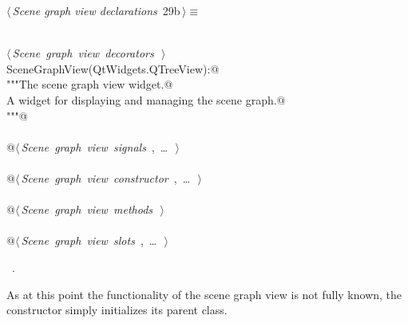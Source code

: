 \documentclass[
    a4paper,      %
    10pt,         %
    openright,    %
    notitlepage,  %
    parskip=half, %
]{scrreprt}       %
\theoremstyle{definition}                    %
\begin{document}
\begin{flushleft} \small
\begin{minipage}{\linewidth}\label{scrap27}\raggedright\small
{} $\langle\,${\itshape Scene graph view declarations}\nobreak\ {\footnotesize {29b}}$\,\rangle\equiv$
\vspace{-1ex}
\begin{list}{}{} \item
\mbox{}\lstinline@@\\
\mbox{}\lstinline@@\hbox{$\langle\,${\itshape Scene graph view decorators}\nobreak\ {\footnotesize {}}$\,\rangle$}\lstinline@@\\
\mbox{}\lstinline@class SceneGraphView(QtWidgets.QTreeView):@\\
\mbox{}\lstinline@    """The scene graph view widget.@\\
\mbox{}\lstinline@    A widget for displaying and managing the scene graph.@\\
\mbox{}\lstinline@    """@\\
\mbox{}\lstinline@@\\
\mbox{}\lstinline@    @\hbox{$\langle\,${\itshape Scene graph view signals}\nobreak\ {\footnotesize {}, \ldots\ }$\,\rangle$}\lstinline@@\\
\mbox{}\lstinline@@\\
\mbox{}\lstinline@    @\hbox{$\langle\,${\itshape Scene graph view constructor}\nobreak\ {\footnotesize {}, \ldots\ }$\,\rangle$}\lstinline@@\\
\mbox{}\lstinline@@\\
\mbox{}\lstinline@    @\hbox{$\langle\,${\itshape Scene graph view methods}\nobreak\ {\footnotesize {}}$\,\rangle$}\lstinline@@\\
\mbox{}\lstinline@@\\
\mbox{}\lstinline@    @\hbox{$\langle\,${\itshape Scene graph view slots}\nobreak\ {\footnotesize {}, \ldots\ }$\,\rangle$}\lstinline@@\\
\mbox{}\lstinline@@{\NWsep}
\end{list}
\vspace{-1.5ex}
\footnotesize
\begin{list}{}{\setlength{\itemsep}{-\parsep}\setlength{\itemindent}{-\leftmargin}}
\item \NWtxtMacroRefIn\ .

\item{}
\end{list}
\end{minipage}\vspace{4ex}
\end{flushleft}
As at this point the functionality of the scene graph view is not fully
known, the constructor simply initializes its parent class.
\end{document}

